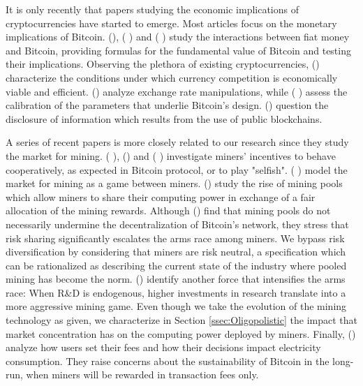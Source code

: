 \documentclass[12pt, a4paper]{article}
\begin{document}
It is only recently that papers studying the economic implications of
cryptocurrencies have started to emerge. Most articles focus on the monetary implications
of Bitcoin. \citeauthor{Schilling} (\citeyear{Schilling}), \citeauthor{Biais2018} (%
\citeyear{Biais2018}) and \citeauthor{Hong} (%
\citeyear{Hong}) study the
interactions between fiat money and Bitcoin, providing formulas for the fundamental value of Bitcoin
and testing their implications. Observing the plethora of existing
cryptocurrencies, \citeauthor{Fernandez} (\citeyear{Fernandez}) characterize the
conditions under which currency competition is economically viable and efficient. \citeauthor{Gandal} (\citeyear{Gandal})
analyze exchange rate manipulations, while \citeauthor{Chiu} (%
\citeyear{Chiu}) assess the calibration of the parameters that
underlie Bitcoin's design. \citeauthor{Cong} (\citeyear{Cong})
question the disclosure of information which results from the use of
public blockchains.

A series of recent papers is more closely related to our research since they
study the market for mining. \citeauthor{Rosenfeld} (\citeyear{Rosenfeld}%
), \citeauthor{Houy} (\citeyear{Houy}) and \citeauthor{Biais} (%
\citeyear{Biais}) investigate miners' incentives to behave cooperatively, as
expected in Bitcoin protocol, or to play "selfish". \citeauthor{Ma} (%
\citeyear{Ma}) model the market for mining as a game between miners. \citeauthor{Cong2018} (\citeyear{Cong2018})
study the rise of mining pools which allow miners to share their computing power in exchange
of a fair allocation of the mining rewards. Although \citeauthor{Cong2018} (\citeyear{Cong2018}) find that mining pools do not
necessarily undermine the decentralization of Bitcoin's network,
they stress that risk sharing significantly escalates the arms race among miners.
We bypass risk diversification by considering that miners are risk neutral, a specification which can be rationalized as describing the current
state of the industry where pooled mining has become the norm.
\citeauthor{Alsabah} (\citeyear{Alsabah}) identify another force that intensifies the arms race: When
R\&D is endogenous, higher
investments in research translate into a more aggressive mining game.
Even though we take the evolution of the mining technology as given, we characterize in Section
\ref{ssec:Oligopolistic} the impact that market concentration has on the computing power deployed by miners.
Finally,
\citeauthor{Huberman} (\citeyear{Huberman}) analyze how users set
their fees and how their decisions impact electricity consumption. They raise concerns about the
sustainability of Bitcoin in the long-run, when
miners will be rewarded in transaction fees only.
\end{document}
